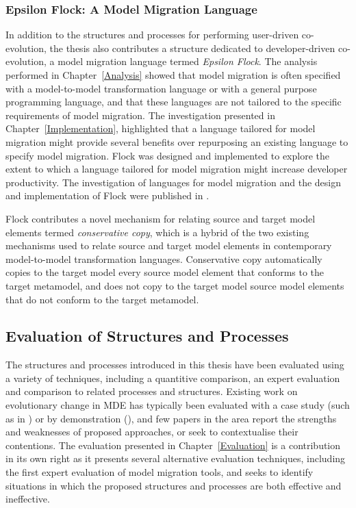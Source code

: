 \subsubsection{Epsilon Flock: A Model Migration Language}
In addition to the structures and processes for performing user-driven co-evolution, the thesis also contributes a structure dedicated to developer-driven co-evolution, a model migration language termed \emph{Epsilon Flock}. The analysis performed in Chapter~\ref{Analysis} showed that model migration is often specified with a model-to-model transformation language or with a general purpose programming language, and that these languages are not tailored to the specific requirements of model migration. The investigation presented in Chapter~\ref{Implementation}, highlighted that a language tailored for model migration might provide several benefits over repurposing an existing language to specify model migration. Flock was designed and implemented to explore the extent to which a language tailored for model migration might increase developer productivity. The investigation of languages for model migration and the design and implementation of Flock were published in \cite{rose10flock}.

Flock contributes a novel mechanism for relating source and target model elements termed \emph{conservative copy}, which is a hybrid of the two existing mechanisms used to relate source and target model elements in contemporary model-to-model transformation languages. Conservative copy automatically copies to the target model every source model element that conforms to the target metamodel, and does not copy to the target model source model elements that do not conform to the target metamodel.


\subsection{Evaluation of Structures and Processes}
The structures and processes introduced in this thesis have been evaluated using a variety of techniques, including a quantitive comparison, an expert evaluation and comparison to related processes and structures. Existing work on evolutionary change in MDE has typically been evaluated with a case study (such as in \cite{sprinkle03thesis}) or by demonstration (\cite{cicchetti08thesis}), and few papers in the area report the strengths and weaknesses of proposed approaches, or seek to contextualise their contentions. The evaluation presented in Chapter~\ref{Evaluation} is a contribution in its own right as it presents several alternative evaluation techniques, including the first expert evaluation of model migration tools, and seeks to identify situations in which the proposed structures and processes are both effective and ineffective.

